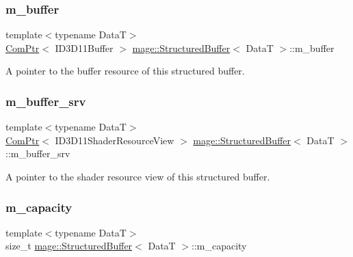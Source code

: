 \subsubsection{\texorpdfstring{m\+\_\+buffer}{m\_buffer}}
{\footnotesize\ttfamily template$<$typename DataT$>$ \\
\hyperlink{namespacemage_ae74f374780900893caa5555d1031fd79}{Com\+Ptr}$<$ I\+D3\+D11\+Buffer $>$ \hyperlink{classmage_1_1_structured_buffer}{mage\+::\+Structured\+Buffer}$<$ DataT $>$\+::m\+\_\+buffer\hspace{0.3cm}{\ttfamily [private]}}

A pointer to the buffer resource of this structured buffer. \hypertarget{classmage_1_1_structured_buffer_a94f811f1d36cf63dad600e6f89dcc40b}{}\label{classmage_1_1_structured_buffer_a94f811f1d36cf63dad600e6f89dcc40b} 
\subsubsection{\texorpdfstring{m\+\_\+buffer\+\_\+srv}{m\_buffer\_srv}}
{\footnotesize\ttfamily template$<$typename DataT$>$ \\
\hyperlink{namespacemage_ae74f374780900893caa5555d1031fd79}{Com\+Ptr}$<$ I\+D3\+D11\+Shader\+Resource\+View $>$ \hyperlink{classmage_1_1_structured_buffer}{mage\+::\+Structured\+Buffer}$<$ DataT $>$\+::m\+\_\+buffer\+\_\+srv\hspace{0.3cm}{\ttfamily [private]}}

A pointer to the shader resource view of this structured buffer. \hypertarget{classmage_1_1_structured_buffer_a539f6e6d27380db47acd69ba8917d4c0}{}\label{classmage_1_1_structured_buffer_a539f6e6d27380db47acd69ba8917d4c0} 
\subsubsection{\texorpdfstring{m\+\_\+capacity}{m\_capacity}}
{\footnotesize\ttfamily template$<$typename DataT$>$ \\
size\+\_\+t \hyperlink{classmage_1_1_structured_buffer}{mage\+::\+Structured\+Buffer}$<$ DataT $>$\+::m\+\_\+capacity\hspace{0.3cm}{\ttfamily [private]}}

